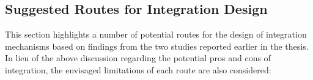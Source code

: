 


\subsection{Suggested Routes for Integration Design}

This section highlights a number of potential routes for the design of integration mechanisms based on findings from the two studies reported earlier in the thesis. In lieu of the above discussion regarding the potential pros and cons of integration, the envisaged limitations of each route are also considered:

